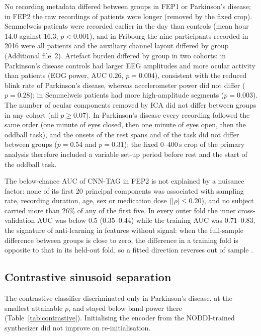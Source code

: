 \documentclass[pdflatex,referee,sn-basic]{sn-jnl}%
\begin{document}
No recording metadata differed between groups in FEP1 or Parkinson's disease; in FEP2 the raw recordings of patients were longer (removed by the fixed crop). Semmelweis patients were recorded earlier in the day than controls (mean hour $14.0$ against $16.3$, $p<0.001$), and in Fribourg the nine participants recorded in 2016 were all patients and the auxiliary channel layout differed by group (Additional file~2). Artefact burden differed by group in two cohorts: in Parkinson's disease controls had larger EEG amplitudes and more ocular activity than patients (EOG power, AUC $0.26$, $p=0.004$), consistent with the reduced blink rate of Parkinson's disease, whereas accelerometer power did not differ ($p=0.28$); in Semmelweis patients had more high-amplitude segments ($p=0.003$). The number of ocular components removed by ICA did not differ between groups in any cohort (all $p\geq0.07$). In Parkinson's disease every recording followed the same order (one minute of eyes closed, then one minute of eyes open, then the oddball task), and the onsets of the rest spans and of the task did not differ between groups ($p=0.54$ and $p=0.31$); the fixed 0--400\,s crop of the primary analysis therefore included a variable set-up period before rest and the start of the oddball task.

The below-chance AUC of CNN-TAG in FEP2 is not explained by a nuisance factor: none of its first 20 principal components was associated with sampling rate, recording duration, age, sex or medication dose ($|\rho|\leq0.20$), and no subject carried more than $26\%$ of any of the first five. In every outer fold the inner cross-validation AUC was below $0.5$ ($0.35$--$0.44$) while the training AUC was $0.71$--$0.83$, the signature of anti-learning in features without signal: when the full-sample difference between groups is close to zero, the difference in a training fold is opposite to that in its held-out fold, so a fitted direction reverses out of sample \cite{varoquaux2018}.

\subsection{Contrastive sinusoid separation}\label{section:res_contrastive}

 The contrastive classifier discriminated only in Parkinson's disease, at the smallest attainable $p$, and stayed below band power there (Table~\ref{tab:contrastive}). Initialising the encoder from the NODDI-trained synthesizer did not improve on re-initialisation.
\end{document}
